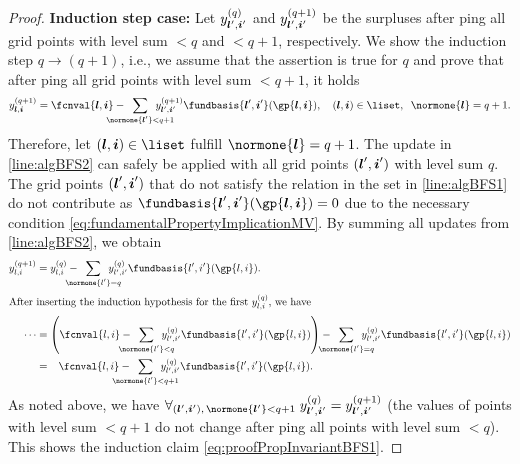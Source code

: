 \begin{proof}
  \noindent
  \textbf{Induction step case:}
  Let $\linout[(q)]{\*l',\*i'}$ and
  $\linout[(q+1)]{\*l',\*i'}$
  be the surpluses after \pop{}ping all
  grid points with level sum $< q$ and $< q + 1$, respectively.
  We show the induction step $q \to (q + 1)$, i.e.,
  we assume that the assertion is true for $q$
  and prove that after \pop{}ping all grid points with level sum $< q + 1$,
  it holds
  \begin{equation}
    \label{eq:proofPropInvariantBFS1}
    \linout[(q+1)]{\*l,\*i}
    = \fcnval{\*l,\*i} -
    \largesum{\normone{\*l'} < q+1} \linout[(q+1)]{\*l',\*i'}
    \fundbasis{\*l',\*i'}(\gp{\*l,\*i}),\quad
    (\*l, \*i) \in \liset,\;\;
    \normone{\*l} = q+1.
  \end{equation}
  Therefore, let $(\*l, \*i) \in \liset$ fulfill $\normone{\*l} = q+1$.
  The update in \cref{line:algBFS2} can safely be applied
  with all grid points $({\boldsymbol{l}}', {\boldsymbol{i}}')$ with level sum $q$.
  The grid points $({\boldsymbol{l}}', {\boldsymbol{i}}')$ that do not satisfy the relation in the set in
  \cref{line:algBFS1} do not contribute as
  $\fundbasis{\*l',\*i'}(\gp{\*l,\*i}) = 0$
  due to the necessary condition \eqref{eq:fundamentalPropertyImplicationMV}.
  By summing all updates from \cref{line:algBFS2}, we obtain
  \begin{subequations}
    \begin{align}
      \linout[(q+1)]{\*l,\*i}
      &= \linout[(q)]{\*l,\*i} -
      \largesum{\normone{\*l'} = q} \linout[(q)]{\*l',\*i'}
      \fundbasis{\*l',\*i'}(\gp{\*l,\*i}).\\
      \intertext{%
        After inserting the induction hypothesis
        for the first $\linout[(q)]{\*l,\*i}$, we have%
      }
      \cdots
      &= \paren*{
        \fcnval{\*l,\*i} -
        \largesum{\normone{\*l'} < q} \linout[(q)]{\*l',\*i'}
        \fundbasis{\*l',\*i'}(\gp{\*l,\*i})
      } -
      \largesum{\normone{\*l'} = q} \linout[(q)]{\*l',\*i'}
      \fundbasis{\*l',\*i'}(\gp{\*l,\*i})\\
      &= \hphantom{\Biggl(}\fcnval{\*l,\*i} -
      \largesum{\normone{\*l'} < q + 1} \linout[(q)]{\*l',\*i'}
      \fundbasis{\*l',\*i'}(\gp{\*l,\*i}).
    \end{align}
  \end{subequations}
  As noted above, we have
  $\fa{(\*l', \*i'),\, \normone{\*l'} < q + 1}{
    \linout[(q)]{\*l',\*i'} = \linout[(q+1)]{\*l',\*i'}
  }$
  (the values of points with level sum $< q + 1$
  do not change after \pop{}ping all points with level sum $< q$).
  This shows the induction claim \eqref{eq:proofPropInvariantBFS1}.
\end{proof}



